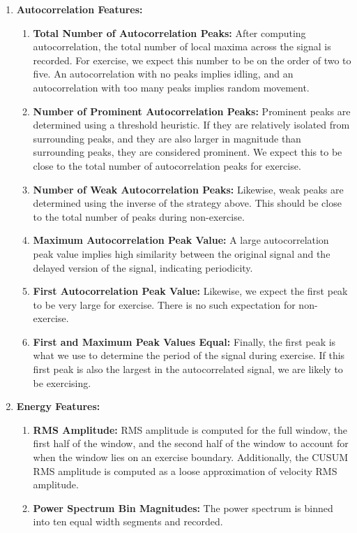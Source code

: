 \begin{enumerate}
    \item \textbf{Autocorrelation Features:}
    \begin{enumerate}
        \item \textbf{Total Number of Autocorrelation Peaks:} After computing autocorrelation, the total number of local maxima across the signal is recorded. For exercise, we expect this number to be on the order of two to five. An autocorrelation with no peaks implies idling, and an autocorrelation with too many peaks implies random movement.
        \item \textbf{Number of Prominent Autocorrelation Peaks:} Prominent peaks are determined using a threshold heuristic. If they are relatively isolated from surrounding peaks, and they are also larger in magnitude than surrounding peaks, they are considered prominent. We expect this to be close to the total number of autocorrelation peaks for exercise.
        \item \textbf{Number of Weak Autocorrelation Peaks:} Likewise, weak peaks are determined using the inverse of the strategy above. This should be close to the total number of peaks during non-exercise.
        \item \textbf{Maximum Autocorrelation Peak Value:} A large autocorrelation peak value implies high similarity between the original signal and the delayed version of the signal, indicating periodicity.
        \item \textbf{First Autocorrelation Peak Value:} Likewise, we expect the first peak to be very large for exercise. There is no such expectation for non-exercise.
        \item \textbf{First and Maximum Peak Values Equal:} Finally, the first peak is what we use to determine the period of the signal during exercise. If this first peak is also the largest in the autocorrelated signal, we are likely to be exercising.
    \end{enumerate}        
    \item \textbf{Energy Features:}
    \begin{enumerate}
        \item \textbf{RMS Amplitude:} RMS amplitude is computed for the full window, the first half of the window, and the second half of the window to account for when the window lies on an exercise boundary. Additionally, the CUSUM RMS amplitude is computed as a loose approximation of velocity RMS amplitude.
        \item \textbf{Power Spectrum Bin Magnitudes:} The power spectrum is binned into ten equal width segments and recorded. 

\end{enumerate}
\end{enumerate}
